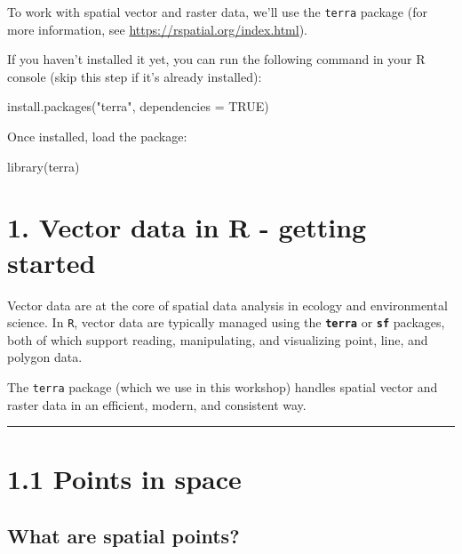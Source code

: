 \documentclass[
]{book}
\newenvironment{Shaded}{\begin{snugshade}}{\end{snugshade}}
\newcommand{\AttributeTok}[1]{\textcolor[rgb]{0.40,0.45,0.13}{#1}}
\newcommand{\ConstantTok}[1]{\textcolor[rgb]{0.56,0.35,0.01}{#1}}
\newcommand{\FunctionTok}[1]{\textcolor[rgb]{0.28,0.35,0.67}{#1}}
\newcommand{\NormalTok}[1]{\textcolor[rgb]{0.00,0.23,0.31}{#1}}
\newcommand{\StringTok}[1]{\textcolor[rgb]{0.13,0.47,0.30}{#1}}
\begin{document}
To work with spatial vector and raster data, we'll use the
\texttt{terra} package (for more information, see
\url{https://rspatial.org/index.html}).

If you haven't installed it yet, you can run the following command in
your R console (skip this step if it's already installed):

\begin{Shaded}
\begin{Highlighting}[]
\FunctionTok{install.packages}\NormalTok{(}\StringTok{"terra"}\NormalTok{, }\AttributeTok{dependencies =} \ConstantTok{TRUE}\NormalTok{)}
\end{Highlighting}
\end{Shaded}

Once installed, load the package:

\begin{Shaded}
\begin{Highlighting}[]
 \FunctionTok{library}\NormalTok{(terra)}
\end{Highlighting}
\end{Shaded}

\section{1. Vector data in R - getting
started}\label{vector-data-in-r---getting-started}

Vector data are at the core of spatial data analysis in ecology and
environmental science. In \texttt{R}, vector data are typically managed
using the \textbf{\texttt{terra}} or \textbf{\texttt{sf}} packages, both
of which support reading, manipulating, and visualizing point, line, and
polygon data.

The \texttt{terra} package (which we use in this workshop) handles
spatial vector and raster data in an efficient, modern, and consistent
way.

\begin{center}\rule{0.5\linewidth}{0.5pt}\end{center}

\section{1.1 Points in space}\label{points-in-space}

\subsection{What are spatial points?}\label{what-are-spatial-points}
\end{document}
